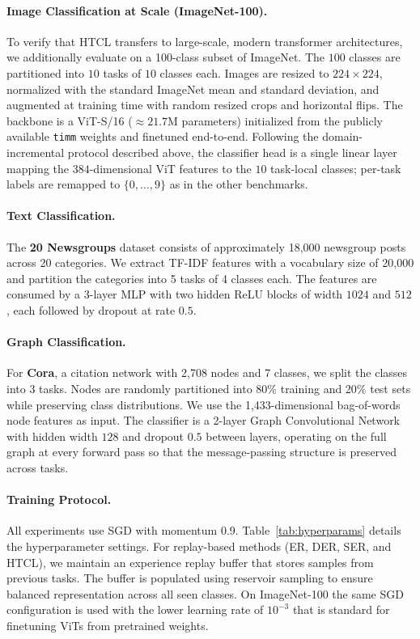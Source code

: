 \paragraph{Image Classification at Scale (ImageNet-100).}
To verify that HTCL transfers to large-scale, modern transformer architectures, we additionally evaluate on a 100-class subset of ImageNet. The $100$ classes are partitioned into $10$ tasks of $10$ classes each. Images are resized to $224\!\times\!224$, normalized with the standard ImageNet mean and standard deviation, and augmented at training time with random resized crops and horizontal flips. The backbone is a ViT-S/16 ($\approx\!21.7$M parameters) initialized from the publicly available \texttt{timm} weights and finetuned end-to-end. Following the domain-incremental protocol described above, the classifier head is a single linear layer mapping the $384$-dimensional ViT features to the
$10$ task-local classes; per-task labels are remapped to $\{0, \ldots, 9\}$ as in the other benchmarks. 

\paragraph{Text Classification.}
The \textbf{20 Newsgroups} dataset consists of approximately 18,000 newsgroup posts across 20 categories. We extract TF-IDF features with a vocabulary size of 20,000 and partition the categories into 5 tasks of 4 classes each. The features are consumed by a 3-layer MLP with two hidden ReLU blocks of width $1024$ and $512$, each followed by dropout at rate $0.5$.

\paragraph{Graph Classification.}
For \textbf{Cora}, a citation network with 2,708 nodes and 7 classes, we split the classes into 3 tasks. Nodes are randomly partitioned into 80\% training and 20\% test sets while preserving class distributions. We use the 1,433-dimensional bag-of-words node features as input. The classifier is a 2-layer Graph Convolutional Network with hidden width $128$ and dropout $0.5$ between layers, operating on the full graph at every forward pass so that the message-passing structure is preserved across tasks.

\paragraph{Training Protocol.}
All experiments use SGD with momentum 0.9. Table~\ref{tab:hyperparams} details the hyperparameter settings. For replay-based methods (ER, DER, SER, and HTCL), we maintain an experience replay buffer that stores samples from previous tasks. The buffer is populated using reservoir sampling to ensure balanced representation across all seen classes. On ImageNet-100 the same SGD configuration is used with the lower learning rate of $10^{-3}$ that is standard for finetuning ViTs from pretrained weights.

